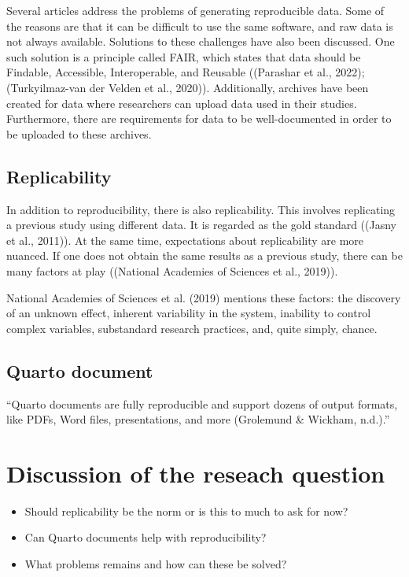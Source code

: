 \documentclass[
  a4paper,
]{article}
\providecommand{\tightlist}{%
  \setlength{\itemsep}{0pt}\setlength{\parskip}{0pt}}\usepackage{longtable,booktabs,array}
\begin{document}
Several articles address the problems of generating reproducible data.
Some of the reasons are that it can be difficult to use the same
software, and raw data is not always available. Solutions to these
challenges have also been discussed. One such solution is a principle
called FAIR, which states that data should be Findable, Accessible,
Interoperable, and Reusable ((Parashar et al., 2022);(Turkyilmaz-van der
Velden et al., 2020)). Additionally, archives have been created for data
where researchers can upload data used in their studies. Furthermore,
there are requirements for data to be well-documented in order to be
uploaded to these archives.

\subsection{Replicability}\label{replicability}

In addition to reproducibility, there is also replicability. This
involves replicating a previous study using different data. It is
regarded as the gold standard ((Jasny et al., 2011)). At the same time,
expectations about replicability are more nuanced. If one does not
obtain the same results as a previous study, there can be many factors
at play ((National Academies of Sciences et al., 2019)).

National Academies of Sciences et al. (2019) mentions these factors: the
discovery of an unknown effect, inherent variability in the system,
inability to control complex variables, substandard research practices,
and, quite simply, chance.

\subsection{Quarto document}\label{quarto-document}

``Quarto documents are fully reproducible and support dozens of output
formats, like PDFs, Word files, presentations, and more (Grolemund \&
Wickham, n.d.).''

\section{Discussion of the reseach
question}\label{discussion-of-the-reseach-question}

\begin{itemize}
\tightlist
\item
  Should replicability be the norm or is this to much to ask for now?
\item
  Can Quarto documents help with reproducibility?
\item
  What problems remains and how can these be solved?
\end{itemize}
\end{document}

